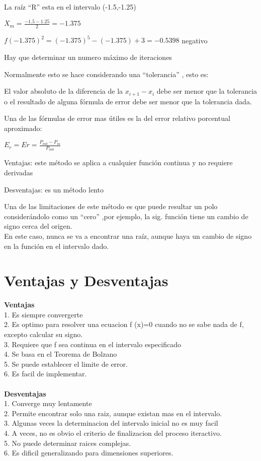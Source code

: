 \documentclass{article}
\begin{document}
\begin{multicols}{2}
La raíz “R” esta en el intervalo (-1.5,-1.25)

\begin{center}
$X_{m}=\frac{-1.5-1.25}{2}=-1.375$
\end{center} 

$f (-1.375)^2 = (-1.375)^5 - (-1.375) + 3 = -0.5398 $ negativo

Hay que determinar un numero máximo de iteraciones

Normalmente esto se hace considerando una “tolerancia” , esto es:

El valor absoluto de la diferencia de la  $x_{i+1}-x_{i}$ debe ser menor que la tolerancia o el resultado de alguna fórmula de error debe ser menor que la tolerancia dada.

Una de las fórmulas de error mas útiles es la del error relativo porcentual aproximado: 
\begin{center}
        $ E_{r}=Er=\frac{P_{m0}-P_{m}}{P_{m0}}$
\end{center}
Ventajas: este método se aplica a cualquier función continua y no requiere derivadas 

Desventajas: es un método lento 

Una de las limitaciones de este método es que puede resultar un polo considerándolo como un “cero” ,por ejemplo, la sig. función tiene un cambio de signo cerca del origen.
\\
En este caso, nunca se va a encontrar una raíz, aunque haya un cambio de signo en la función en el intervalo dado.

\section{Ventajas y Desventajas}
\label{sec:Ven}
\textbf{Ventajas}
\\
1. Es siempre convergerte 
\\
2. Es optimo para resolver una ecuacion f (x)=0 cuando no se sabe nada de f, excepto calcular su signo.
\\
3. Requiere que f sea continua en el intervalo especificado
\\
4. Se basa en el Teorema de Bolzano
\\
5. Se puede establecer el limite de error.
\\
6. Es facil de implementar.
\\
\\
\textbf{Desventajas}
\\
1. Converge muy lentamente 
\\
2. Permite encontrar solo una raiz, aunque existan mas en el intervalo.
\\
3. Algunas veces la determinacion del intervalo inicial no es muy facil
\\
4. A veces, no es obvio el criterio de finalizacion del proceso iteractivo.
\\
5. No puede determinar  raices complejas.
\\
6. Es dificil generalizando para dimensiones superiores.




\end{multicols}
\end{document}
